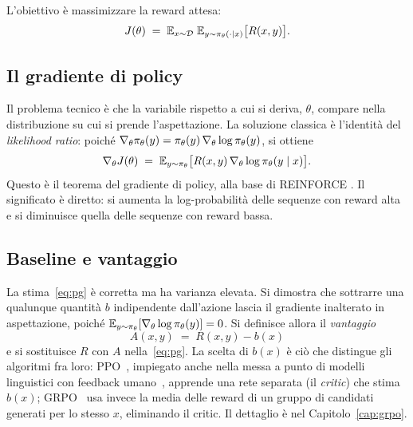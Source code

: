 L'obiettivo è massimizzare la reward attesa:
\begin{equation}
  \label{eq:rl-objective}
  J(\theta) \;=\; \mathbb{E}_{x \sim \mathcal{D}}\;
                  \mathbb{E}_{y \sim \pi_\theta(\cdot \mid x)}
                  \big[ R(x, y) \big].
\end{equation}

\subsection{Il gradiente di policy}

Il problema tecnico è che la variabile rispetto a cui si deriva, $\theta$,
compare nella distribuzione su cui si prende l'aspettazione. La soluzione
classica è l'identità del \emph{likelihood ratio}: poiché
$\nabla_\theta \pi_\theta(y) = \pi_\theta(y)\, \nabla_\theta \log \pi_\theta(y)$, si
ottiene
\begin{equation}
  \label{eq:pg}
  \nabla_\theta J(\theta)
  \;=\;
  \mathbb{E}_{y \sim \pi_\theta}\big[ R(x,y)\, \nabla_\theta \log \pi_\theta(y \mid x) \big].
\end{equation}
Questo è il teorema del gradiente di policy, alla base di REINFORCE
\cite{williams1992reinforce}. Il significato è diretto: si aumenta la
log-probabilità delle sequenze con reward alta e si diminuisce quella delle
sequenze con reward bassa.

\subsection{Baseline e vantaggio}

La stima~\eqref{eq:pg} è corretta ma ha varianza elevata. Si dimostra che
sottrarre una qualunque quantità $b$ indipendente dall'azione lascia il
gradiente inalterato in aspettazione, poiché
$\mathbb{E}_{y \sim \pi_\theta}[\nabla_\theta \log \pi_\theta(y)] = 0$. Si definisce
allora il \emph{vantaggio}
\begin{equation}
  \label{eq:advantage}
  A(x,y) \;=\; R(x,y) - b(x)
\end{equation}
e si sostituisce $R$ con $A$ nella~\eqref{eq:pg}. La scelta di $b(x)$ è ciò che
distingue gli algoritmi fra loro: PPO~\cite{schulman2017ppo}, impiegato anche
nella messa a punto di modelli linguistici con feedback
umano~\cite{ouyang2022instructgpt}, apprende una rete
separata (il \emph{critic}) che stima $b(x)$; GRPO~\cite{shao2024grpo} usa
invece la media delle reward di un gruppo di candidati generati per lo stesso
$x$, eliminando il critic. Il dettaglio è nel Capitolo~\ref{cap:grpo}.


